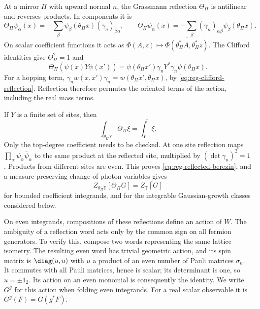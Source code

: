 At a mirror $\Pi$ with upward normal $n$, the Grassmann reflection
$\Theta_\Pi$ is antilinear and reverses products. In components it is
\begin{equation}\label{eq:reg-grassmann-reflection}
 \Theta_\Pi\psi_\alpha(x)
  =-\sum_\beta\bar\psi_\beta(\theta_\Pi x)(\gamma_n)_{\beta\alpha},
 \qquad
 \Theta_\Pi\bar\psi_\alpha(x)
  =-\sum_\beta(\gamma_n)_{\alpha\beta}\psi_\beta(\theta_\Pi x).
\end{equation}
On scalar coefficient functions it acts as
$\Phi(A,z)\mapsto\overline{\Phi(\theta_\Pi^*A,\theta_\Pi^*z)}$.
The Clifford identities give $\Theta_\Pi^2=1$ and
\begin{equation}\label{eq:reg-reflected-bilinear}
 \Theta_\Pi(\bar\psi(x)Y\psi(x'))
 =\bar\psi(\theta_\Pi x')\gamma_nY^*\gamma_n\psi(\theta_\Pi x).
\end{equation}
For a hopping term,
$\gamma_nw(x,x')\gamma_n=w(\theta_\Pi x',\theta_\Pi x)$, by
\eqref{eq:reg-clifford-reflection}. Reflection therefore permutes the
oriented terms of the action, including the real mass terms.

If $Y$ is a finite set of sites, then
\begin{equation}\label{eq:reg-reflected-berezin}
 \int_{\theta_\Pi Y}\Theta_\Pi\xi=\overline{\int_Y\xi}.
\end{equation}
Only the top-degree coefficient needs to be checked. At one site
reflection maps $\prod_\alpha\psi_\alpha\bar\psi_\alpha$ to the same
product at the reflected site, multiplied by $(\det\gamma_n)^2=1$.
Products from different sites are even. This proves
\eqref{eq:reg-reflected-berezin}, and a measure-preserving change of
photon variables gives
\begin{equation}\label{eq:reg-reflected-functional}
 Z_{\theta_\Pi\mathbb T}[\Theta_\Pi G]
 =\overline{Z_{\mathbb T}[G]}
\end{equation}
for bounded coefficient integrands, and for the integrable
Gaussian-growth classes considered below.

On even integrands, compositions of these reflections define an
action of $W$. The ambiguity of a reflection word acts only by the
common sign on all fermion generators. To verify this, compose two
words representing the same lattice isometry. The resulting even
word has trivial geometric action, and its spin matrix is
$\diag(u,u)$ with $u$ a product of an even number of Pauli matrices
$\sigma_n$. It commutes with all Pauli matrices, hence is scalar;
its determinant is one, so $u=\pm1_2$. Its action on an even monomial
is consequently the identity. We write $G^g$ for this action when
folding even integrands. For a real scalar observable it is
$G^g(F)=G(g^*F)$.

